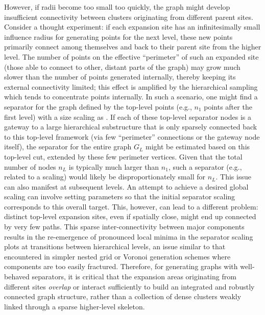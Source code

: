 However, if radii become too small too quickly, the graph might develop insufficient connectivity between clusters originating from different parent sites.
Consider a thought experiment: if each expansion site has an infinitesimally small influence radius for generating points for the next level, these new points primarily connect among themselves and back to their parent site from the higher level.
The number of points on the effective \enquote{perimeter} of such an expanded site (those able to connect to other, distant parts of the graph) may grow much slower than the number of points generated internally, thereby keeping its external connectivity limited; this effect is amplified by the hierarchical sampling which tends to concentrate points internally.
In such a scenario, one might find a separator for the graph defined by the top-level points (e.g., \(n_1\) points after the first level) with a size scaling as .
If each of these top-level separator nodes is a gateway to a large hierarchical substructure that is only sparsely connected back to this top-level framework (via few \enquote{perimeter} connections or the gateway node itself), the separator for the entire graph \(G_L\) might be estimated based on this top-level cut, extended by these few perimeter vertices.
Given that the total number of nodes \(n_L\) is typically much larger than \(n_1\), such a separator (e.g., related to a  scaling) would likely be disproportionately small for \(n_L\).
This issue can also manifest at subsequent levels.
An attempt to achieve a desired global  scaling can involve setting parameters so that the initial  separator scaling corresponds to this overall target.
This, however, can lead to a different problem: distinct top-level expansion sites, even if spatially close, might end up connected by very few paths.
This sparse inter-connectivity between major components results in the re-emergence of pronounced local minima in the separator scaling plots at transitions between hierarchical levels, an issue similar to that encountered in simpler nested grid or Voronoi generation schemes where components are too easily fractured.
Therefore, for generating graphs with well-behaved separators, it is critical that the expansion areas originating from different sites \emph{overlap} or interact sufficiently to build an integrated and robustly connected graph structure, rather than a collection of dense clusters weakly linked through a sparse higher-level skeleton.

